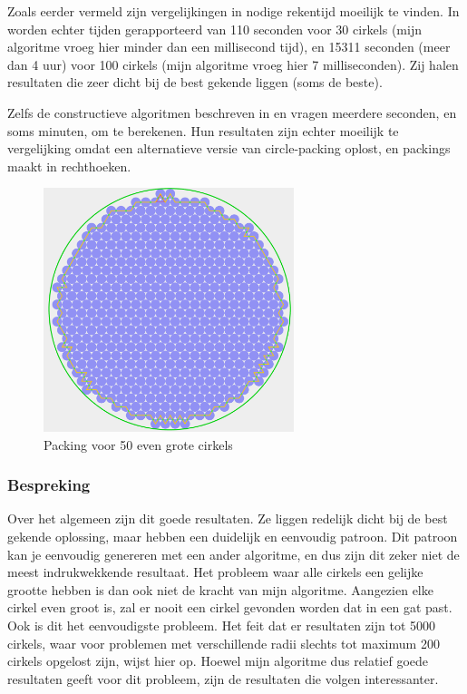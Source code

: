 \documentclass[12pt,a4paper,oneside]{book}
\begin{document}
Zoals eerder vermeld zijn vergelijkingen in nodige rekentijd moeilijk te vinden.
In \cite{grosso2010} worden echter tijden gerapporteerd van 110 seconden voor 30 cirkels (mijn algoritme vroeg hier minder dan een millisecond tijd), en 15311 seconden (meer dan 4 uur) voor 100 cirkels (mijn algoritme vroeg hier 7 milliseconden).
Zij halen resultaten die zeer dicht bij de best gekende liggen (soms de beste).

Zelfs de constructieve algoritmen beschreven in \cite{akeb2006basic} en \cite{hifi2004approximate} vragen meerdere seconden, en soms minuten, om te berekenen.
Hun resultaten zijn echter moeilijk te vergelijking omdat \cite{akeb2006basic} een alternatieve versie van circle-packing oplost, en \cite{hifi2004approximate} packings maakt in rechthoeken.

\begin{figure}
  \centering
  \includegraphics[width=0.65\textwidth]{packing-even-groot-50.png}
  \caption{Packing voor 50 even grote cirkels} \label{fig:packing-even-groot-50} 
\end{figure}

\subsubsection{Bespreking}

Over het algemeen zijn dit goede resultaten.
Ze liggen redelijk dicht bij de best gekende oplossing, maar hebben een duidelijk en eenvoudig patroon.
Dit patroon kan je eenvoudig genereren met een ander algoritme, en dus zijn dit zeker niet de meest indrukwekkende resultaat.
Het probleem waar alle cirkels een gelijke grootte hebben is dan ook niet de kracht van mijn algoritme.
Aangezien elke cirkel even groot is, zal er nooit een cirkel gevonden worden dat in een gat past.
Ook is dit het eenvoudigste probleem.
Het feit dat er resultaten zijn tot 5000 cirkels, waar voor problemen met verschillende radii slechts tot maximum 200 cirkels opgelost zijn, wijst hier op.
Hoewel mijn algoritme dus relatief goede resultaten geeft voor dit probleem, zijn de resultaten die volgen interessanter.
\end{document}
